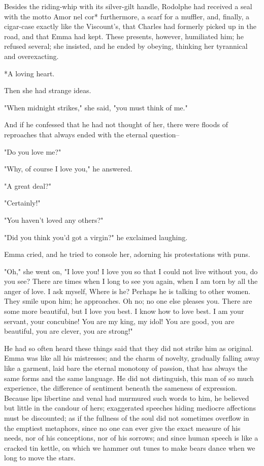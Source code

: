 \documentclass{tufte-book}
\begin{document}
Besides the riding-whip with its silver-gilt handle, Rodolphe had
received a seal with the motto Amor nel cor* furthermore, a scarf for
a muffler, and, finally, a cigar-case exactly like the Viscount's, that
Charles had formerly picked up in the road, and that Emma had kept.
These presents, however, humiliated him; he refused several; she
insisted, and he ended by obeying, thinking her tyrannical and
overexacting.

     *A loving heart.

Then she had strange ideas.

"When midnight strikes," she said, "you must think of me."

And if he confessed that he had not thought of her, there were floods of
reproaches that always ended with the eternal question--

"Do you love me?"

"Why, of course I love you," he answered.

"A great deal?"

"Certainly!"

"You haven't loved any others?"

"Did you think you'd got a virgin?" he exclaimed laughing.

Emma cried, and he tried to console her, adorning his protestations with
puns.

"Oh," she went on, "I love you! I love you so that I could not live
without you, do you see? There are times when I long to see you again,
when I am torn by all the anger of love. I ask myself, Where is
he? Perhaps he is talking to other women. They smile upon him; he
approaches. Oh no; no one else pleases you. There are some more
beautiful, but I love you best. I know how to love best. I am your
servant, your concubine! You are my king, my idol! You are good, you are
beautiful, you are clever, you are strong!"

He had so often heard these things said that they did not strike him as
original. Emma was like all his mistresses; and the charm of novelty,
gradually falling away like a garment, laid bare the eternal monotony
of passion, that has always the same forms and the same language. He
did not distinguish, this man of so much experience, the difference of
sentiment beneath the sameness of expression. Because lips libertine
and venal had murmured such words to him, he believed but little in the
candour of hers; exaggerated speeches hiding mediocre affections must be
discounted; as if the fullness of the soul did not sometimes overflow in
the emptiest metaphors, since no one can ever give the exact measure of
his needs, nor of his conceptions, nor of his sorrows; and since human
speech is like a cracked tin kettle, on which we hammer out tunes to
make bears dance when we long to move the stars.
\end{document}
